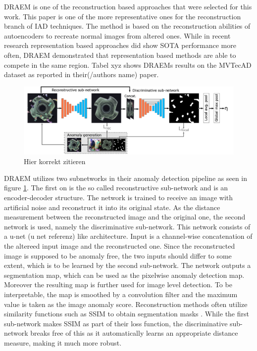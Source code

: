DRAEM \cite{Zavrtanik_2021DRAEM} is one of the reconstruction based approaches that were selected for this work. This paper is one of the more representative ones for the reconstruction branch of 
IAD techniques. The method is based on the reconstruction abilities of autoencoders to recreate normal images from altered ones. While in recent research representation based approaches did 
show SOTA performance more often, DRAEM demonstrated that representation based methods are able to compete in the same region. Tabel xyz shows DRAEMs results on the MVTecAD dataset as reported 
in their(/authors name) paper.\newline

\begin{figure}[ht]
    \centering
    \includegraphics[width=\textwidth]{figures/DRAEM_pipeline.png}
    \caption{Hier korrekt zitieren}
    \label{fig:draempipeline}
\end{figure}

DRAEM utilizes two subnetworks in their anomaly detection pipeline as seen in figure \ref{fig:draempipeline}. The first on is the so called reconstructive sub-network and is an encoder-decoder structure. The network is trained 
to receive an image with artificial noise and reconstruct it into its original state. As the distance measurement between the reconstructed image and the original one, the second network is used, 
namely the discriminative sub-network. This network consists of a u-net (u net referenz) like architecture. Input is a channel-wise concatenation of the altereed input image and the reconstructed 
one. Since the reconstructed image is supposed to be anomaly free, the two inputs should differ to some extent, which is to be learned by the second sub-network. The network outputs a segmentation map, 
which can be used as the pixelwise anomaly detection map. Moreover the resulting map is further used for image level detection. To be interpretable, the map is smoothed by a convolution filter 
and the maximum value is taken as the image anomaly score. Reconstruction methods often utilize similarity functions such as SSIM \cite{Wang_2004SSIM} to obtain segmentation masks \cite{Zavrtanik_2021DRAEM} 
\cite{liu2024deep}. While the first 
sub-network makes SSIM as part of their loss function, the discriminative sub-network breaks free of this as it automatically learns an appropriate distance measure, making it much more robust.


